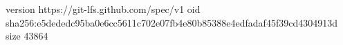 version https://git-lfs.github.com/spec/v1
oid sha256:e5dededc95ba0e6cc5611c702e07fb4e80b85388e4edfadaf45f39cd4304913d
size 43864
